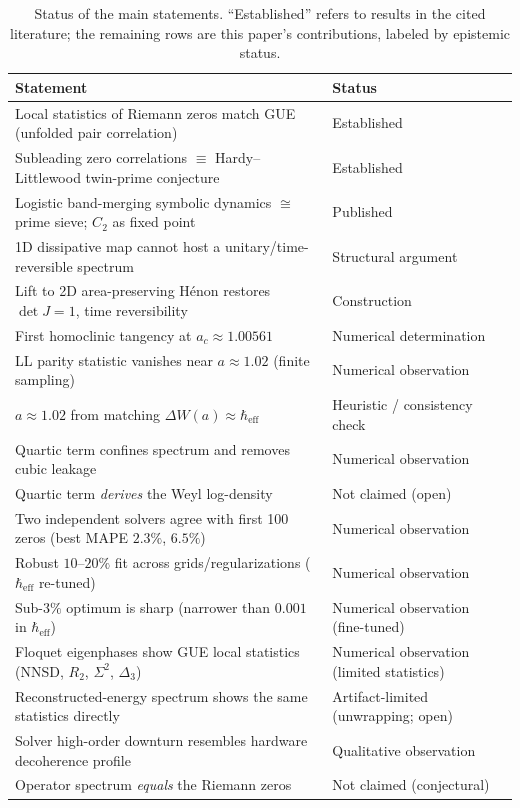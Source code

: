 \documentclass[11pt]{article}
\begin{document}
\begin{table}[h!]
\caption{Status of the main statements. ``Established'' refers to results in the cited literature; the remaining rows are this paper's contributions, labeled by epistemic status.}
\label{tab:claims}
\centering
\small
\begin{tabular}{>{\raggedright\arraybackslash}p{} l}
\toprule
Statement & Status \\
\midrule
Local statistics of Riemann zeros match GUE (unfolded pair correlation) & Established \cite{montgomery1973,odlyzko1987} \\
Subleading zero correlations $\equiv$ Hardy--Littlewood twin-prime conjecture & Established \cite{keating2019} \\
Logistic band-merging symbolic dynamics $\cong$ prime sieve; $C_2$ as fixed point & Published \cite{wang2026} \\
1D dissipative map cannot host a unitary/time-reversible spectrum & Structural argument \\
Lift to 2D area-preserving Hénon restores $\det J=1$, time reversibility & Construction \\
First homoclinic tangency at $a_c \approx 1.00561$ & Numerical determination \\
LL parity statistic vanishes near $a\approx1.02$ (finite sampling) & Numerical observation \\
$a\approx1.02$ from matching $\Delta W(a)\approx\hbar_{\mathrm{eff}}$ & Heuristic / consistency check \\
Quartic term confines spectrum and removes cubic leakage & Numerical observation \\
Quartic term \emph{derives} the Weyl log-density & Not claimed (open) \\
Two independent solvers agree with first 100 zeros (best MAPE $2.3\%$, $6.5\%$) & Numerical observation \\
Robust $10$--$20\%$ fit across grids/regularizations ($\hbar_{\mathrm{eff}}$ re-tuned) & Numerical observation \\
Sub-$3\%$ optimum is sharp (narrower than $0.001$ in $\hbar_{\mathrm{eff}}$) & Numerical observation (fine-tuned) \\
Floquet eigenphases show GUE local statistics (NNSD, $R_2$, $\Sigma^2$, $\Delta_3$) & Numerical observation (limited statistics) \\
Reconstructed-energy spectrum shows the same statistics directly & Artifact-limited (unwrapping; open) \\
Solver high-order downturn resembles hardware decoherence profile & Qualitative observation \\
Operator spectrum \emph{equals} the Riemann zeros & Not claimed (conjectural) \\
\bottomrule
\end{tabular}
\end{table}
\end{document}
